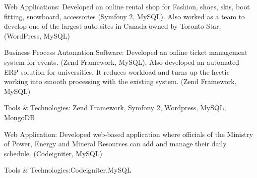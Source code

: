 \documentclass[letterpaper]{deedy-resume} %
\begin{document}
\begin{minipage}[t]{0.66\textwidth}
\begin{tightitemize}
\item Web Applications:
Developed an online rental shop for Fashion, shoes, skis, boot fitting, snowboard, accessories (Symfony 2, MySQL). Also worked as a team to develop one of the largest auto sites in Canada owned by Toronto Star. (WordPress, MySQL)

\item Business Process Automation Software:
Developed an online ticket management system for events. (Zend Framework, MySQL). Also developed an automated ERP solution for universities. It reduces workload and turns up the hectic working into smooth processing with the existing system. (Zend Framework, MySQL)

\item Tools & Technologies: Zend Framework, Symfony 2, Wordpress, MySQL, MongoDB
\end{tightitemize}
\sectionspace %


\begin{tightitemize}
\sectionspace
\item Web Application:
Developed web-based application where officials of the Ministry of Power, Energy and Mineral Resources can add and manage their daily schedule. (Codeigniter, MySQL)
\item Tools & Technologies:Codeigniter,MySQL
\end{tightitemize}


\sectionspace %
\end{minipage} %
\end{document}
